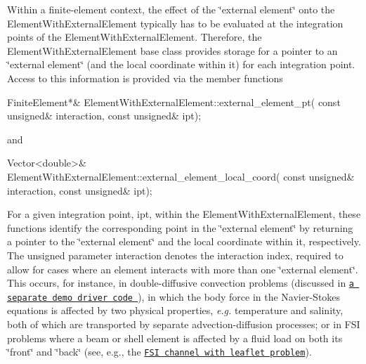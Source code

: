 Within a finite-\/element context, the effect of the \char`\"{}external element\char`\"{} onto the {\ttfamily Element\+With\+External\+Element} typically has to be evaluated at the integration points of the {\ttfamily Element\+With\+External\+Element}. Therefore, the {\ttfamily Element\+With\+External\+Element} base class provides storage for a pointer to an \char`\"{}external element\char`\"{} (and the local coordinate within it) for each integration point. Access to this information is provided via the member functions


\begin{DoxyCode}
FiniteElement*& ElementWithExternalElement::external\_element\_pt(
                                \textcolor{keyword}{const} \textcolor{keywordtype}{unsigned}& interaction, 
                                \textcolor{keyword}{const} \textcolor{keywordtype}{unsigned}& ipt);
\end{DoxyCode}


and


\begin{DoxyCode}
Vector<double>& ElementWithExternalElement::external\_element\_local\_coord(
                      \textcolor{keyword}{const} \textcolor{keywordtype}{unsigned}& interaction, 
                      \textcolor{keyword}{const} \textcolor{keywordtype}{unsigned}& ipt);
\end{DoxyCode}


For a given integration point, {\ttfamily ipt}, within the {\ttfamily Element\+With\+External\+Element}, these functions identify the corresponding point in the \char`\"{}external element\char`\"{} by returning a pointer to the \char`\"{}external element\char`\"{} and the local coordinate within it, respectively. The unsigned parameter {\ttfamily interaction} denotes the interaction index, required to allow for cases where an element interacts with more than one \char`\"{}external element\char`\"{}. This occurs, for instance, in double-\/diffusive convection problems (discussed in \href{../../../../demo_drivers/multi_physics/double_diffusive_convection/multimesh_dd_convection.cc}{\tt a separate demo driver code }), in which the body force in the Navier-\/\+Stokes equations is affected by two physical properties, {\itshape  e.\+g.} temperature and salinity, both of which are transported by separate advection-\/diffusion processes; or in F\+SI problems where a beam or shell element is affected by a fluid load on both its \char`\"{}front\char`\"{} and \char`\"{}back\char`\"{} (see, e.\+g., the \href{../../../interaction/fsi_channel_with_leaflet/html/index.html}{\tt F\+SI channel with leaflet problem}).

